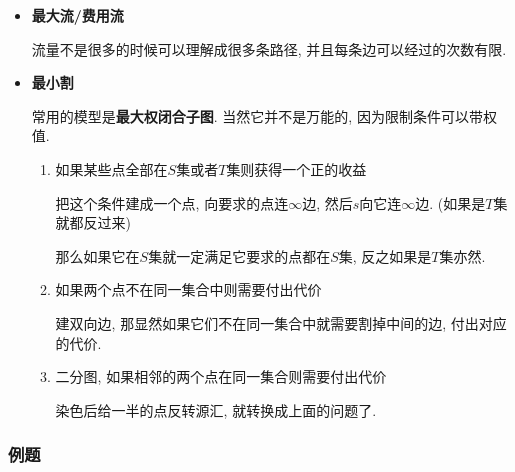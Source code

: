 \begin{itemize}

\item \textbf{最大流/费用流}

流量不是很多的时候可以理解成很多条路径, 并且每条边可以经过的次数有限.

\item \textbf{最小割}

常用的模型是\textbf{最大权闭合子图}. 当然它并不是万能的, 因为限制条件可以带权值.

\begin{enumerate}

\item 如果某些点全部在$S$集或者$T$集则获得一个正的收益

把这个条件建成一个点, 向要求的点连$\infty$边, 然后$s$向它连$\infty$边. (如果是$T$集就都反过来)

那么如果它在$S$集就一定满足它要求的点都在$S$集, 反之如果是$T$集亦然.

\item 如果两个点不在同一集合中则需要付出代价

建双向边, 那显然如果它们不在同一集合中就需要割掉中间的边, 付出对应的代价.

\item 二分图, 如果相邻的两个点在同一集合则需要付出代价

染色后给一半的点反转源汇, 就转换成上面的问题了.

\end{enumerate}

\end{itemize}

\subsubsection{例题}

